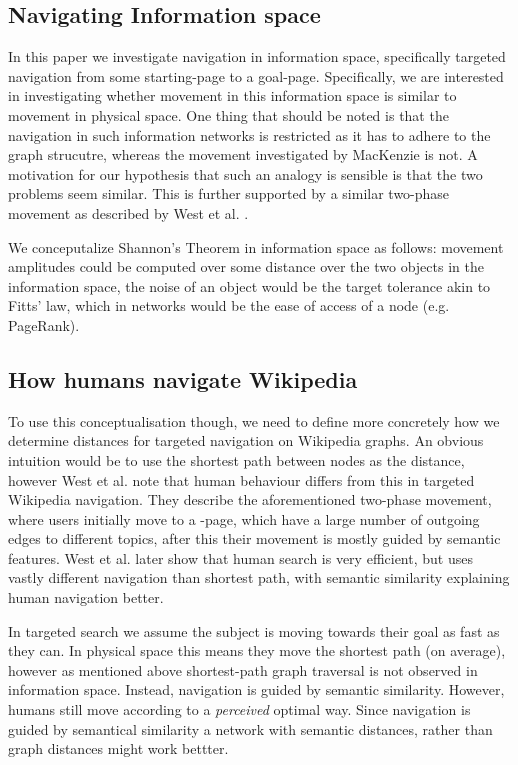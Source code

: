 \subsection{Navigating Information space}
In this paper we investigate navigation in information space, specifically targeted navigation from some starting-page to a goal-page. Specifically, we are interested in investigating whether movement in this information space is similar to movement in physical space. One thing that should be noted is that the navigation in such information networks is restricted as it has to adhere to the graph strucutre, whereas the movement investigated by MacKenzie\cite{mackenzie2018fitts} is not. A motivation for our hypothesis that such an analogy is sensible is that the two problems seem similar. This is further supported by a similar two-phase movement as described by West et al. \cite{semdistances}. 

We conceputalize Shannon's Theorem in information space as follows: movement amplitudes could be computed over some distance over the two objects in the information space, the noise of an object would be the target tolerance akin to Fitts' law, which in networks would be the ease of access of a node (e.g. PageRank).


\subsection{How humans navigate Wikipedia}
To use this conceptualisation though, we need to define more concretely how we determine distances for targeted navigation on Wikipedia graphs. An obvious intuition would be to use the shortest path between nodes as the distance, however West et al. note that human behaviour differs from this\cite{humanwayfinding} in targeted Wikipedia navigation. They describe the aforementioned two-phase movement, where users initially move to a -page, which have a large number of outgoing edges to different topics, after this their movement is mostly guided by semantic features. West et al. later show that human search is very efficient, but uses vastly different navigation than shortest path, with semantic similarity explaining human navigation better\cite{humanwayfinding}. 

In targeted search we assume the subject is moving towards their goal as fast as they can. In physical space this means they move the shortest path (on average), however as mentioned above shortest-path graph traversal is not observed in information space. Instead, navigation is guided by semantic similarity. However, humans still move according to a \textit{perceived} optimal way. Since navigation is guided by semantical similarity\cite{semdistances} a network with semantic distances, rather than graph distances might work bettter. 

